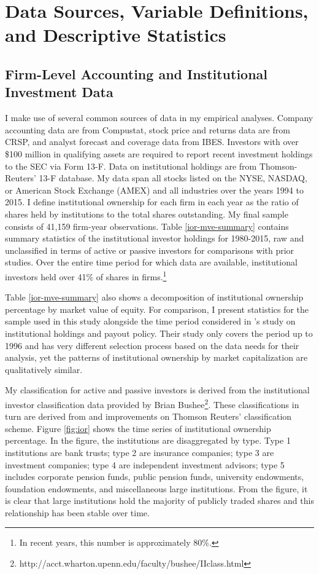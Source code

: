 \documentclass[thesis]{thesis-umich}
\begin{document}
\chapter{Data Sources, Variable Definitions, and Descriptive Statistics} \label{chap:data} 
\section{Firm-Level Accounting and Institutional Investment Data}
I make use of several common sources of data in my empirical analyses.
Company accounting data are from Compustat, stock price and returns data are from CRSP, and analyst forecast and coverage data from IBES. 
Investors with over \$100 million in qualifying assets are required to report recent investment holdings to the SEC via Form 13-F. Data on institutional holdings are from Thomson-Reuters' 13-F database. My data span all stocks listed on the NYSE, NASDAQ, or American Stock Exchange (AMEX) and all industries over the years 1994 to 2015. I define institutional ownership for each firm in each year as the ratio of shares held by institutions to the total shares outstanding. My final sample consists of 41,159 firm-year observations. Table \ref{ior-mve-summary} contains summary statistics of the institutional investor holdings for 1980-2015, raw and unclassified in terms of active or passive investors for comparisons with prior studies. Over the entire time period for which data are available, institutional investors held over 41\% of shares in firms.\footnote{In recent years, this number is approximately 80\%.}

Table \ref{ior-mve-summary} also shows a decomposition of institutional ownership percentage by market value of equity. For comparison, I present statistics for the sample used in this study alongside the time period considered in \cite{grinsteinmichaely2005}'s study on institutional holdings and payout policy. Their study only covers the period up to 1996 and has very different selection process based on the data needs for their analysis, yet the patterns of institutional ownership by market capitalization are qualitatively similar. 

My classification for active and passive investors is derived from the institutional investor classification data provided by Brian Bushee\footnote{http://acct.wharton.upenn.edu/faculty/bushee/IIclass.html}. These classifications in turn are derived from and improvements on Thomson Reuters' classification scheme. Figure \ref{fig:ior} shows the time series of institutional ownership percentage. In the figure, the institutions are disaggregated by type. Type 1 institutions are bank trusts; type 2 are insurance companies; type 3 are investment companies; type 4 are independent investment advisors; type 5 includes corporate pension funds, public pension funds, university endowments, foundation endowments, and miscellaneous large institutions. From the figure, it is clear that large institutions hold the majority of publicly traded shares and this relationship has been stable over time.
\end{document}

